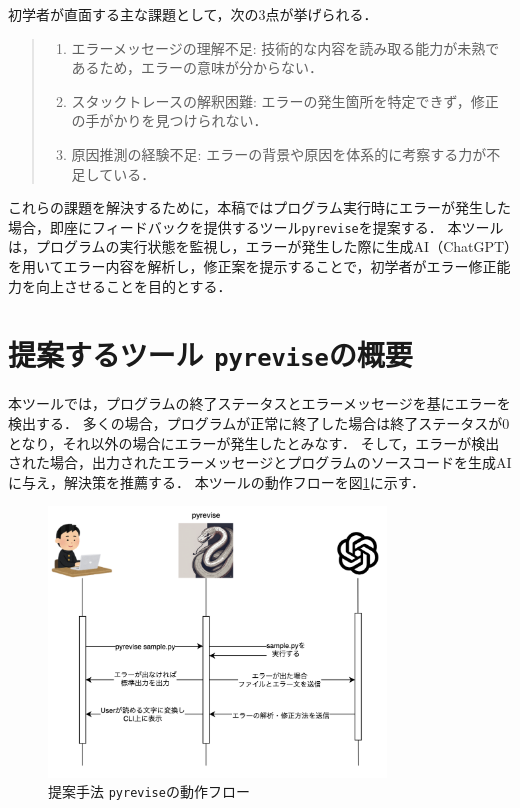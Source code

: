 \documentclass[12pt,twoside]{jbook}
\newcommand{\pyrevise}{\texttt{pyrevise}}
\begin{document}
初学者が直面する主な課題として，次の3点が挙げられる．
\begin{quote}
	\begin{enumerate}
	 \item エラーメッセージの理解不足: 技術的な内容を読み取る能力が未熟であるため，エラーの意味が分からない．
	 \item スタックトレースの解釈困難: エラーの発生箇所を特定できず，修正の手がかりを見つけられない．
	 \item 原因推測の経験不足: エラーの背景や原因を体系的に考察する力が不足している．
	\end{enumerate}
\end{quote}
これらの課題を解決するために，本稿ではプログラム実行時にエラーが発生した場合，即座にフィードバックを提供するツール\pyrevise を提案する．
本ツールは，プログラムの実行状態を監視し，エラーが発生した際に生成AI（ChatGPT）を用いてエラー内容を解析し，修正案を提示することで，初学者がエラー修正能力を向上させることを目的とする．

\section{提案するツール \pyrevise の概要}
本ツールでは，プログラムの終了ステータスとエラーメッセージを基にエラーを検出する．
多くの場合，プログラムが正常に終了した場合は終了ステータスが0となり，それ以外の場合にエラーが発生したとみなす．
そして，エラーが検出された場合，出力されたエラーメッセージとプログラムのソースコードを生成AIに与え，解決策を推薦する．
本ツールの動作フローを図\ref{fig:flowchart}に示す．

\begin{figure}[h]
  \centering
  \includegraphics[width=0.8\textwidth]{images/flowchart.png}
  \caption{提案手法 \pyrevise の動作フロー}
  \label{fig:flowchart}
\end{figure}
\end{document}
